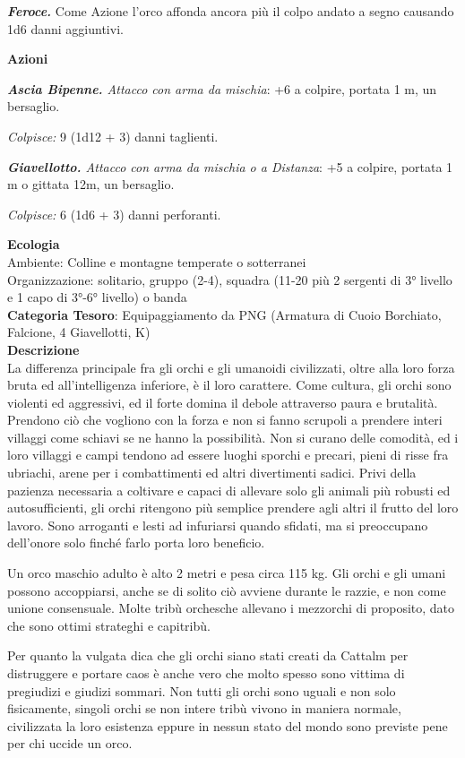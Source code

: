 \begin{multicols}{2}
{\emph{\textbf{Feroce.}} Come Azione l'orco affonda ancora più il colpo andato a segno causando 1d6 danni aggiuntivi.

\textbf{Azioni}

\emph{\textbf{Ascia Bipenne.} Attacco con arma da mischia}: +6 a colpire, portata 1 m, un bersaglio.

\emph{Colpisce:} 9 (1d12 + 3) danni taglienti.

\emph{\textbf{Giavellotto.} Attacco con arma da mischia o a Distanza}: +5 a colpire, portata 1 m o gittata 12m, un bersaglio.

\emph{Colpisce:} 6 (1d6 + 3) danni perforanti.

\textbf{Ecologia}\\
Ambiente: Colline e montagne temperate o sotterranei\\
Organizzazione: solitario, gruppo (2-4), squadra (11-20 più 2 sergenti di 3° livello e 1 capo di 3°-6° livello) o banda \\
\textbf{Categoria Tesoro}: Equipaggiamento da PNG (Armatura di Cuoio Borchiato, Falcione, 4 Giavellotti, K)\\
\textbf{Descrizione}\\
La differenza principale fra gli orchi e gli umanoidi civilizzati, oltre alla loro forza bruta ed all'intelligenza inferiore, è il loro carattere. Come cultura, gli orchi sono violenti ed aggressivi, ed il forte domina il debole attraverso paura e brutalità. Prendono ciò che vogliono con la forza e non si fanno scrupoli a prendere interi villaggi come schiavi se ne hanno la possibilità. Non si curano delle comodità, ed i loro villaggi e campi tendono ad essere luoghi sporchi e precari, pieni di risse fra ubriachi, arene per i combattimenti ed altri divertimenti sadici. Privi della pazienza necessaria a coltivare e capaci di allevare solo gli animali più robusti ed autosufficienti, gli orchi ritengono più semplice prendere agli altri il frutto del loro lavoro. Sono arroganti e lesti ad infuriarsi quando sfidati, ma si preoccupano dell'onore solo finché farlo porta loro beneficio.

Un orco maschio adulto è alto 2 metri e pesa circa 115 kg. Gli orchi e gli umani possono accoppiarsi, anche se di solito ciò avviene durante le razzie, e non come unione consensuale. Molte tribù orchesche allevano i mezzorchi di proposito, dato che sono ottimi strateghi e capitribù.

Per quanto la vulgata dica che gli orchi siano stati creati da Cattalm per distruggere e portare caos è anche vero che molto spesso sono vittima di pregiudizi e giudizi sommari. Non tutti gli orchi sono uguali e non solo fisicamente, singoli orchi se non intere tribù vivono in maniera normale, civilizzata la loro esistenza eppure in nessun stato del mondo sono previste pene per chi uccide un orco.

}
\end{multicols}
